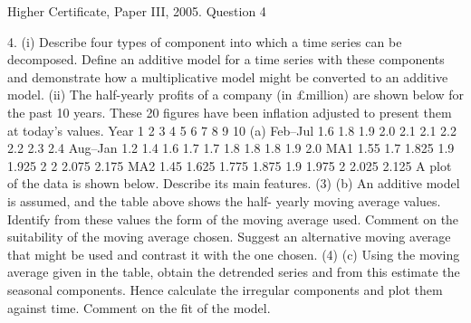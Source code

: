 \documentclass[a4paper,12pt]{article}
\begin{document}
Higher Certificate, Paper III, 2005. Question 4
\begin{framed}
4.
(i) Describe four types of component into which a time series can be decomposed.
Define an additive model for a time series with these components and
demonstrate how a multiplicative model might be converted to an additive
model.
(ii) The half-yearly profits of a company (in £million) are shown below for the past 10 years. These 20 figures have been inflation adjusted to present them at
today's values.
Year
1
2
3
4
5
6
7
8
9
10
(a)
Feb–Jul
1.6
1.8
1.9
2.0
2.1
2.1
2.2
2.2
2.3
2.4
Aug–Jan
1.2
1.4
1.6
1.7
1.7
1.8
1.8
1.8
1.9
2.0
MA1
1.55
1.7
1.825
1.9
1.925
2
2
2.075
2.175
MA2
1.45
1.625
1.775
1.875
1.9
1.975
2
2.025
2.125
A plot of the data is shown below. Describe its main features.
(3)
(b) An additive model is assumed, and the table above shows the half-
yearly moving average values. Identify from these values the form of
the moving average used. Comment on the suitability of the moving
average chosen. Suggest an alternative moving average that might be
used and contrast it with the one chosen.
(4)
(c) Using the moving average given in the table, obtain the detrended
series and from this estimate the seasonal components. Hence calculate
the irregular components and plot them against time. Comment on the
fit of the model.
\end{framed}
\end{document}
